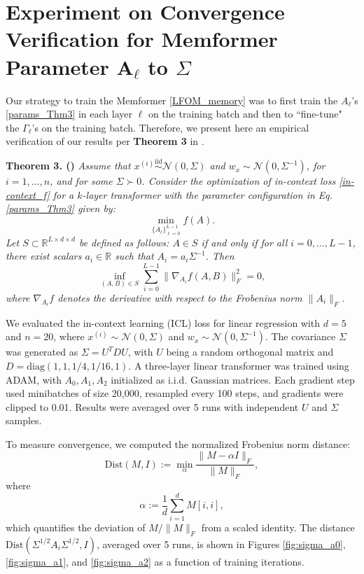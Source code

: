 \documentclass[11pt]{article}
\theoremstyle{plain}
\theoremstyle{definition}
\theoremstyle{remark}
\numberwithin{equation}{section}
\begin{document}
\section{Experiment on Convergence Verification for Memformer Parameter \( \mathbf{A}_\ell \) to \( \Sigma \)}

Our strategy to train the Memformer \eqref{LFOM_memory} was to first train the \( A_\ell \)'s \eqref{params_Thm3} in each layer \(\ell\) on the training batch and then to ``fine-tune" the \( \Gamma_\ell \)'s on the training batch. Therefore, we present here an empirical verification of our results per \textbf{Theorem 3} in \cite{ahn2024transformers}. 

\textbf{Theorem 3. (\cite{ahn2024transformers})} \textit{Assume that \( x^{(i)} \overset{\text{iid}}{\sim} \mathcal{N}(0, \Sigma) \) and \( w_x \sim \mathcal{N}(0, \Sigma^{-1}) \), for \( i = 1, \ldots, n \), and for some \( \Sigma \succ 0 \). Consider the optimization of in-context loss \eqref{in-context_f} for a \( k \)-layer transformer with the parameter configuration in Eq. \eqref{params_Thm3} given by:
\[
\min_{\{A_\ell\}_{\ell=0}^{L-1}} f(A).
\]
Let \( S \subset \mathbb{R}^{L \times d \times d} \) be defined as follows: \( A \in S \) if and only if for all \( i = 0, \ldots, L-1 \), there exist scalars \( a_i \in \mathbb{R} \) such that \( A_i = a_i \Sigma^{-1} \). Then
\[
\inf_{(A, B) \in S} \sum_{i=0}^{L-1} \|\nabla_{A_i} f(A, B)\|_F^2 = 0,
\]
where \( \nabla_{A_i} f \) denotes the derivative with respect to the Frobenius norm \( \|A_i\|_F \).}

We evaluated the in-context learning (ICL) loss for linear regression with \( d = 5 \) and \( n = 20 \), where \( x^{(i)} \sim \mathcal{N}(0, \Sigma) \) and \( w_x \sim \mathcal{N}(0, \Sigma^{-1}) \). The covariance \( \Sigma \) was generated as \( \Sigma = U^T D U \), with \( U \) being a random orthogonal matrix and \( D = \text{diag}(1, 1, 1/4, 1/16, 1) \). A three-layer linear transformer was trained using ADAM, with \( A_0, A_1, A_2 \) initialized as i.i.d. Gaussian matrices. Each gradient step used minibatches of size 20,000, resampled every 100 steps, and gradients were clipped to 0.01. Results were averaged over 5 runs with independent \( U \) and \( \Sigma \) samples.

To measure convergence, we computed the normalized Frobenius norm distance:
\[
\text{Dist}(M, I) := \min_{\alpha} \frac{\| M - \alpha I \|_F}{\| M \|_F},
\]
where
\[
\alpha := \frac{1}{d} \sum_{i=1}^d M[i, i],
\]
which quantifies the deviation of \( M / \| M \|_F \) from a scaled identity. The distance \(\text{Dist}(\Sigma^{1/2} A_i \Sigma^{1/2}, I)\), averaged over 5 runs, is shown in Figures \ref{fig:sigma_a0}, \ref{fig:sigma_a1}, and \ref{fig:sigma_a2} as a function of training iterations.
\end{document}
